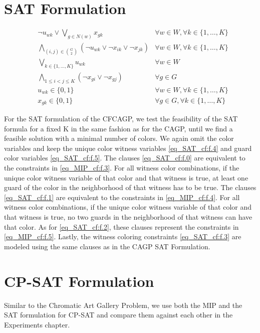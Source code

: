 \section{SAT Formulation}

\begin{align}
\label{eq_SAT_cf:f.0}&\lnot u_{wk} \lor \bigvee_{g \in N(w)}x_{gk} & \forall w \in W, \forall k\in \{1,\ldots,K\}\\
\label{eq_SAT_cf:f.1}&\bigwedge_{(i,j)\in {G\choose 2}} (\lnot u_{wk} \lor \lnot x_{ik} \lor \lnot x_{jk}) & \forall w \in W, \forall k\in \{1,\ldots,K\}\\
\label{eq_SAT_cf:f.2}&\bigvee_{k\in \{1,\ldots,K\}}u_{wk} & \forall w\in W\\
\label{eq_SAT_cf:f.3}&\bigwedge_{1 \leq i < j \leq K} (\lnot x_{gi} \lor \lnot x_{gj}) & \forall g\in G\\
\label{eq_SAT_cf:f.4}& u_{wk} \in \{0,1\} & \forall w\in W, \forall k\in \{1,\ldots,K\}\\
\label{eq_SAT_cf:f.5}& x_{gk} \in \{0,1\} & \forall g\in G, \forall k\in \{1,\ldots,K\}
\end{align}

For the SAT formulation of the CFCAGP, we test the feasibility of the SAT formula for a fixed K in the same fashion as for the CAGP, until we find a feasible solution with a minimal number of colors. We again omit the color variables and keep the unique color witness variables \cref{eq_SAT_cf:f.4} and guard color variables \cref{eq_SAT_cf:f.5}. The clauses \cref{eq_SAT_cf:f.0} are equivalent to the constraints in \cref{eq_MIP_cf:f.3}. For all witness color combinations, if the unique color witness variable of that color and that witness is true, at least one guard of the color in the neighborhood of that witness has to be true. The clauses \cref{eq_SAT_cf:f.1} are equivalent to the constraints in \cref{eq_MIP_cf:f.4}. For all witness color combinations, if the unique color witness variable of that color and that witness is true, no two guards in the neighborhood of that witness can have that color. As for \cref{eq_SAT_cf:f.2}, these clauses represent the constraints in \cref{eq_MIP_cf:f.5}. Lastly, the witness coloring constraints \cref{eq_SAT_cf:f.3} are modeled using the same clauses as in the CAGP SAT Formulation.

\section{CP-SAT Formulation}
Similar to the Chromatic Art Gallery Problem, we use both the MIP and the SAT formulation for CP-SAT and compare them against each other in the Experiments chapter.

